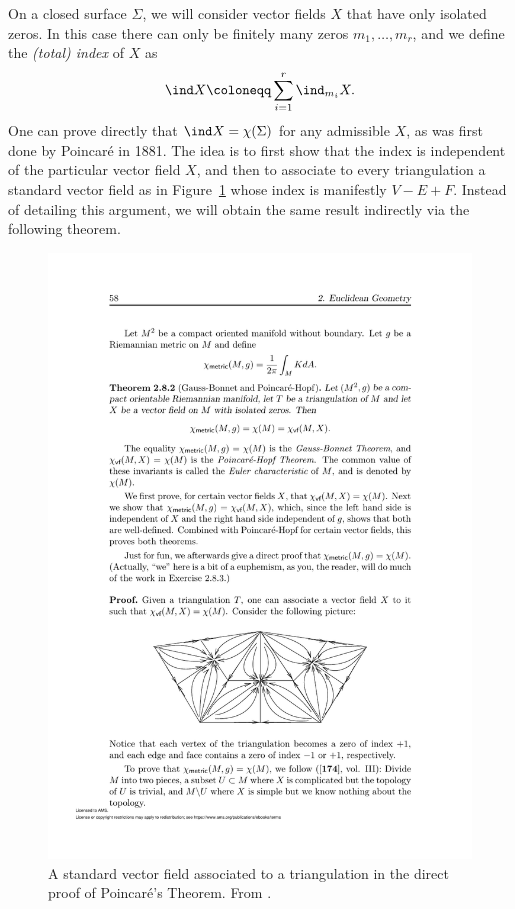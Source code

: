 On a closed surface $\Sigma$, we will consider vector fields $X$ that have only isolated zeros. In this case there can only be finitely many zeros $m_1,\ldots,m_r$, and we define the \emph{(total) index} of $X$ as 
\[\ind X\coloneqq \sum_{i=1}^r \ind_{m_i}X.\]
One can prove directly that $\ind X=\chi(\Sigma)$ for any admissible $X$, as was first done by Poincar\'e in 1881. The idea is to first show that the index is independent of the particular vector field $X$, and then to associate to every triangulation a standard vector field as in Figure~\ref{fig poincare-hopf} whose index is manifestly $V-E+F$. Instead of detailing this argument, we will obtain the same result indirectly via the following theorem.

\begin{figure}[tp]
    \centering
    \includegraphics[scale=0.8]{figures/poincare-hopf.pdf}
    \caption{A standard vector field associated to a triangulation in the direct proof of Poincar\'e's Theorem. From \cite{Ivey}. \label{fig poincare-hopf}}
\end{figure}


